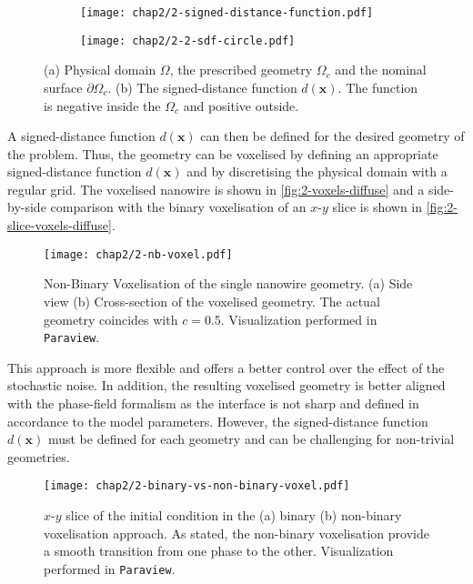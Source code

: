     \begin{figure}[H]
        \centering
        \begin{subfigure}{0.4\textwidth}
            \centering
            \texttt{[image: chap2/2-signed-distance-function.pdf]}
            \caption{}
            \label{fig:2-physical-domain}
        \end{subfigure}%
        \begin{subfigure}{0.4\textwidth}
            \centering
            \texttt{[image: chap2/2-2-sdf-circle.pdf]}
            \caption{}
            \label{fig:2-signed-distance-func}
        \end{subfigure}
        \caption{(a) Physical domain $\Omega$, the prescribed geometry $\Omega_c$ and the nominal surface $\partial \Omega_c$. (b) The signed-distance function $d(\mathbf{x})$. The function is negative inside the $\Omega_c$ and positive outside.}
        \label{fig:2-signed-distance}
    \end{figure}
    A signed-distance function $d(\mathbf{x})$ can then be defined for the desired geometry of the problem. Thus, the geometry can be voxelised by defining an appropriate signed-distance function $d(\mathbf{x})$ and by discretising the physical domain with a regular grid. The voxelised nanowire is shown in \autoref{fig:2-voxels-diffuse} and a side-by-side comparison with the binary voxelisation of an $x$-$y$ slice is shown in \autoref{fig:2-slice-voxels-diffuse}.
    \begin{figure}[H]
        \centering
        \texttt{[image: chap2/2-nb-voxel.pdf]}
        \caption{Non-Binary Voxelisation of the single nanowire geometry. (a) Side view (b) Cross-section of the voxelised geometry. The actual geometry coincides with $c=0.5$. Visualization performed in \texttt{Paraview}.}
        \label{fig:2-voxels-diffuse}
    \end{figure}
    This approach is more flexible and offers a better control over the effect of the stochastic noise. In addition, the resulting voxelised geometry is better aligned with the phase-field formalism as the interface is not sharp and defined in accordance to the model parameters. However, the signed-distance function $d(\mathbf{x})$ must be defined for each geometry and can be challenging for non-trivial geometries.
    \begin{figure}[H]
        \centering
        \texttt{[image: chap2/2-binary-vs-non-binary-voxel.pdf]}
        \caption{$x$-$y$ slice of the initial condition in the (a) binary (b) non-binary voxelisation approach. As stated, the non-binary voxelisation provide a smooth transition from one phase to the other. Visualization performed in \texttt{Paraview}.}
        \label{fig:2-slice-voxels-diffuse}
    \end{figure}

